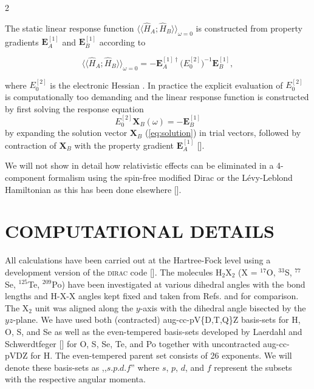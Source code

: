 \documentclass[a4paper,12pt,english]{article}
\begin{document}
\begin{spacing}{2}
\par The static linear response function $\langle\langle\hat{H}_A;\hat{H}_B\rangle\rangle_{\omega=0}$ is constructed from property gradients $\mathbf{E}_A^{[1]}$ and $\mathbf{E}_B^{[1]}$ according to

\begin{equation}
  \langle\langle\hat{H}_A;\hat{H}_B\rangle\rangle_{\omega=0} = -\mathbf{E}_A^{[1]\dag}\bigl(E_0^{[2]}\bigr)^{-1}\mathbf{E}_B^{[1]},
\end{equation}

\noindent where $E_0^{[2]}$ is the electronic Hessian . In practice the explicit evaluation of $E_0^{[2]}$ is computationally too demanding and the linear response function is constructed by first solving the response equation
\begin{equation}\label{eq:solution}
  E_0^{[2]}\mathbf{X}_B(\omega) = -\mathbf{E}_B^{[1]}
\end{equation}
by expanding the solution vector $\mathbf{X}_B$ (\ref{eq:solution}) in trial vectors, followed by contraction of $\mathbf{X}_B$ with the property gradient $\mathbf{E}_A^{[1]}$ [\cite{saue:linres}].

\par We will not show in detail how relativistic effects can be eliminated in a 4-component formalism using the spin-free modified Dirac or the L\'evy-Leblond Hamiltonian as this has been done elsewhere [\cite{saue2005advquantumchem}].
\section{COMPUTATIONAL DETAILS}

\noindent All calculations have been carried out at the Hartree-Fock level using a development version of the \textsc{dirac} code [\cite{dirac}]. The molecules H$_2$X$_2$ (X = $^{17}$O, $^{33}$S, $^{77}$Se, $^{125}$Te, $^{209}$Po) have been investigated at various dihedral angles with the bond lengths and H-X-X angles kept fixed and taken from Refs. \cite{berger2003chemphyschem} and \cite{peter1999physreva} for comparison. The X$_2$ unit was aligned along the $y$-axis with the dihedral angle bisected by the $yz$-plane. We have used both (contracted) \mbox{aug-cc-pV\{D,T,Q\}Z} basis-sets for H, O, S, and Se as well as the even-tempered basis-sets developed by Laerdahl and Schwerdtfeger [\cite{peter1999physreva}] for O, S, Se, Te, and Po together with uncontracted aug-cc-pVDZ for H. The even-tempered parent set consists of 26 exponents. We will denote these basis-sets as ,,$s$.$p$.$d$.$f$\/'' where $s$, $p$, $d$, and $f$ represent the subsets with the respective angular momenta.


\end{spacing}
\end{document}
